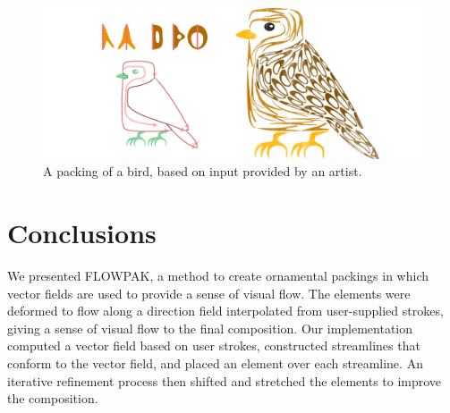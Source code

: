 \begin{figure}
\centering
\includegraphics[width=1.0\textwidth]{figures/flowpak/bird_square.pdf}
\caption[A packing of a bird]
{A packing of a bird, based on input provided by
  an artist.}
\label{bird_square}
\end{figure}


\section{Conclusions}
\label{flowpak_conclusions}

We presented FLOWPAK, a method to create ornamental packings
in which vector fields are used to provide a sense of visual flow. 
The elements were deformed to flow along a direction field interpolated
from user-supplied strokes, giving a sense of visual flow to the final composition.
Our implementation computed a vector field based on user strokes,
constructed streamlines that conform to the vector field, and placed an
element over each streamline. An iterative refinement process then
shifted and stretched the elements to improve the composition.




